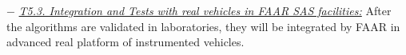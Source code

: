 \documentclass[a4paper,11pt]{article}
\begin{document}
\begin{itemize}[leftmargin=.2in,noitemsep,nolistsep]
%
\subitem$-$  \underline{\it T5.3. Integration and Tests with real vehicles in FAAR SAS facilities:} 
After the algorithms are validated in laboratories, they will be integrated by FAAR in advanced real platform of instrumented vehicles.


\end{itemize}
\end{document}
